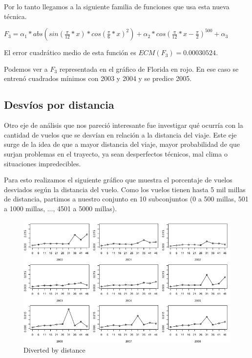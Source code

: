 Por lo tanto llegamos a la siguiente familia de funciones que usa esta nueva t\'ecnica.

$F_3 = \alpha_1 * abs(sin(\frac{\pi}{12}*x) * cos(\frac{\pi}{6}*x)^2) + \alpha_2 * cos(\frac{\pi}{12}*x - \frac{\pi}{2})^{500} + \alpha_3$

El error cuadr\'atico medio de esta funci\'on es $ECM(F_3) = 0.00030524$.

Podemos ver a $F_3$ representada en el gr\'afico de Florida en rojo. En ese caso se entren\'o cuadrados m\'inimos con 2003 y 2004 y se predice 2005.

\subsection{Desv\'ios por distancia}

Otro eje de análisis que nos pareció interesante fue investigar qué ocurría con la cantidad de vuelos que se desvían en relación a la distancia del viaje. Este eje surge de la idea de que a mayor distancia del viaje, mayor probabilidad de que surjan problemas en el trayecto, ya sean desperfectos técnicos, mal clima o situaciones impredecibles.

Para esto realizamos el siguiente gráfico que muestra el porcentaje de vuelos desviados según la distancia del vuelo. Como los vuelos tienen hasta 5 mil millas de distancia, partimos a nuestro conjunto en 10 subconjuntos (0 a 500 millas, 501 a 1000 millas, ..., 4501 a 5000 millas).

\begin{figure}[h!]
  \begin{center}
	\includegraphics[scale=0.5]{img/diverted_by_distance.png}
	\caption{Diverted by distance}
  \end{center}
\end{figure}

